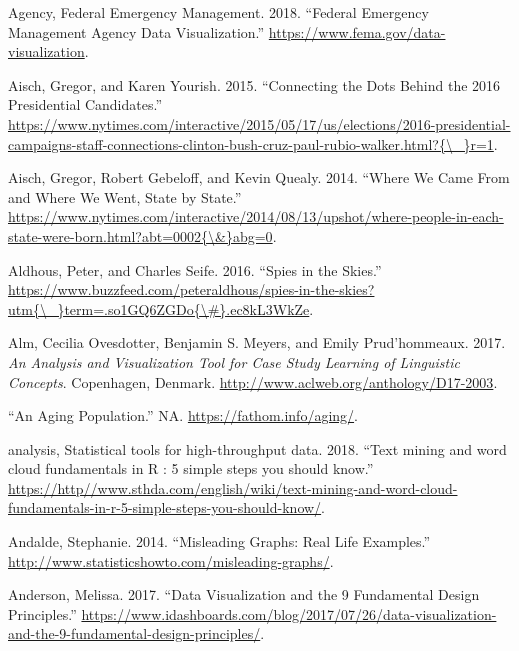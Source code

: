 \documentclass[]{book}
\theoremstyle{definition}
\theoremstyle{definition}
\theoremstyle{definition}
\theoremstyle{remark}
\begin{document}
\hypertarget{ref-fema_viz}{}
Agency, Federal Emergency Management. 2018. ``Federal Emergency
Management Agency Data Visualization.''
\url{https://www.fema.gov/data-visualization}.

\hypertarget{ref-campaign_staff}{}
Aisch, Gregor, and Karen Yourish. 2015. ``Connecting the Dots Behind the
2016 Presidential Candidates.''
\href{https://www.nytimes.com/interactive/2015/05/17/us/elections/2016-presidential-campaigns-staff-connections-clinton-bush-cruz-paul-rubio-walker.html?\%7B/_\%7Dr=1}{https://www.nytimes.com/interactive/2015/05/17/us/elections/2016-presidential-campaigns-staff-connections-clinton-bush-cruz-paul-rubio-walker.html?\{\textbackslash{}\_\}r=1}.

\hypertarget{ref-migration}{}
Aisch, Gregor, Robert Gebeloff, and Kevin Quealy. 2014. ``Where We Came
From and Where We Went, State by State.''
\href{https://www.nytimes.com/interactive/2014/08/13/upshot/where-people-in-each-state-were-born.html?abt=0002\%7B/\&\%7Dabg=0}{https://www.nytimes.com/interactive/2014/08/13/upshot/where-people-in-each-state-were-born.html?abt=0002\{\textbackslash{}\&\}abg=0}.

\hypertarget{ref-spies_sky}{}
Aldhous, Peter, and Charles Seife. 2016. ``Spies in the Skies.''
\href{https://www.buzzfeed.com/peteraldhous/spies-in-the-skies?utm\%7B/_\%7Dterm=.so1GQ6ZGDo\%7B/\#\%7D.ec8kL3WkZe}{https://www.buzzfeed.com/peteraldhous/spies-in-the-skies?utm\{\textbackslash{}\_\}term=.so1GQ6ZGDo\{\textbackslash{}\#\}.ec8kL3WkZe}.

\hypertarget{ref-lingui_data}{}
Alm, Cecilia Ovesdotter, Benjamin S. Meyers, and Emily Prud'hommeaux.
2017. \emph{An Analysis and Visualization Tool for Case Study Learning
of Linguistic Concepts}. Copenhagen, Denmark.
\url{http://www.aclweb.org/anthology/D17-2003}.

\hypertarget{ref-animated_pyramid}{}
``An Aging Population.'' NA. \url{https://fathom.info/aging/}.

\hypertarget{ref-r}{}
analysis, Statistical tools for high-throughput data. 2018. ``Text
mining and word cloud fundamentals in R : 5 simple steps you should
know.''
\url{https://http//www.sthda.com/english/wiki/text-mining-and-word-cloud-fundamentals-in-r-5-simple-steps-you-should-know/}.

\hypertarget{ref-andale_2014}{}
Andalde, Stephanie. 2014. ``Misleading Graphs: Real Life Examples.''
\url{http://www.statisticshowto.com/misleading-graphs/}.

\hypertarget{ref-design_principles}{}
Anderson, Melissa. 2017. ``Data Visualization and the 9 Fundamental
Design Principles.''
\url{https://www.idashboards.com/blog/2017/07/26/data-visualization-and-the-9-fundamental-design-principles/}.
\end{document}
